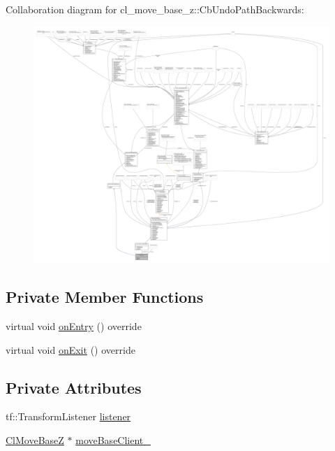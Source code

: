 Collaboration diagram for cl\+\_\+move\+\_\+base\+\_\+z\+:\+:Cb\+Undo\+Path\+Backwards\+:
\nopagebreak
\begin{figure}[H]
\begin{center}
\leavevmode
\includegraphics[width=350pt]{classcl__move__base__z_1_1CbUndoPathBackwards__coll__graph}
\end{center}
\end{figure}
\subsection*{Private Member Functions}
\begin{DoxyCompactItemize}
\item 
virtual void \hyperlink{classcl__move__base__z_1_1CbUndoPathBackwards_a32e680530375b62c7053bf173f6b2b1b}{on\+Entry} () override
\item 
virtual void \hyperlink{classcl__move__base__z_1_1CbUndoPathBackwards_a20cee921ad92db16f8d17c3c3b9c2daf}{on\+Exit} () override
\end{DoxyCompactItemize}
\subsection*{Private Attributes}
\begin{DoxyCompactItemize}
\item 
tf\+::\+Transform\+Listener \hyperlink{classcl__move__base__z_1_1CbUndoPathBackwards_add2b6a0f1c19654a0cf07209fc123a71}{listener}
\item 
\hyperlink{classcl__move__base__z_1_1ClMoveBaseZ}{Cl\+Move\+BaseZ} $\ast$ \hyperlink{classcl__move__base__z_1_1CbUndoPathBackwards_a306d616dab00f50141abed4bfb47aeb2}{move\+Base\+Client\+\_\+}
\end{DoxyCompactItemize}
